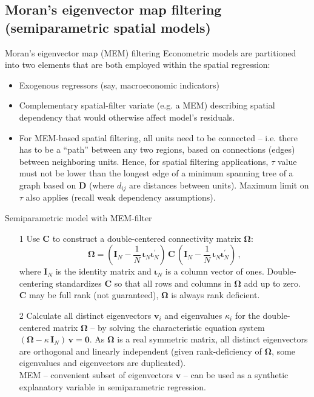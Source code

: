 \documentclass{beamer}
\begin{document}
\subsection{Moran's eigenvector map filtering (semiparametric spatial models)}
\begin{frame}{Moran's eigenvector map (MEM) filtering}
Econometric models are partitioned into two elements that are both employed within the spatial regression:
\medskip
\begin{itemize}
    \item  Exogenous regressors (say, macroeconomic indicators) 
    \smallskip
    \item Complementary spatial-filter variate (e.g. a MEM) describing spatial dependency that would otherwise affect model's residuals.
    \smallskip
    \item For MEM-based spatial filtering, all units need to be connected -- i.e. there has to be a ``path'' between any two regions, based on connections (edges) between neighboring units. Hence, for spatial filtering applications, $\tau$ value must not be lower than the longest edge of a minimum spanning tree of a graph based on $\bm{D}$ (where $d_{ij}$ are distances between units). Maximum limit on $\tau$ also applies (recall weak dependency assumptions).
\end{itemize}
\end{frame}
\begin{frame}{Semiparametric model with MEM-filter}
\begin{itemize}
    \item[1] Use $\bm{C}$ to construct a double-centered connectivity matrix $\bm{\Omega}$:
\begin{equation*}
\bm{\Omega} = (\bm{I}_N - \frac{1}{N}\,\bm{\iota}_N \bm{\iota}_N^{\prime})\, \bm{C} \, (\bm{I}_N - \frac{1}{N}\,\bm{\iota}_N \bm{\iota}_N^{\prime}) \,,
\end{equation*}
where $\bm{I}_N$ is the identity matrix and $\bm{\iota}_N$ is a column vector of ones. Double-centering standardizes $\bm{C}$ so that all rows and columns in $\bm{\Omega}$ add up to zero. $\bm{C}$ may be full rank (not guaranteed), $\bm{\Omega}$ is always rank deficient.
\medskip
\item[2] Calculate all distinct eigenvectors $\bm{v}_i$ and eigenvalues $\kappa_i$ for the double-centered matrix $\bm{\Omega}$ -- by solving the characteristic equation system  $(\bm{\Omega} - \kappa\, \bm{I}_{N}) \, \bm{v} = \bm{0} $. As $\bm{\Omega}$ is a real symmetric matrix, all distinct eigenvectors are orthogonal and linearly independent (given rank-deficiency of $\bm{\Omega}$, some eigenvalues and eigenvectors are duplicated). \\ \medskip 
MEM -- convenient subset of eigenvectors $\bm{v}$ -- can be used as a synthetic explanatory variable in semiparametric regression.
\end{itemize}
\end{frame}
\end{document}
